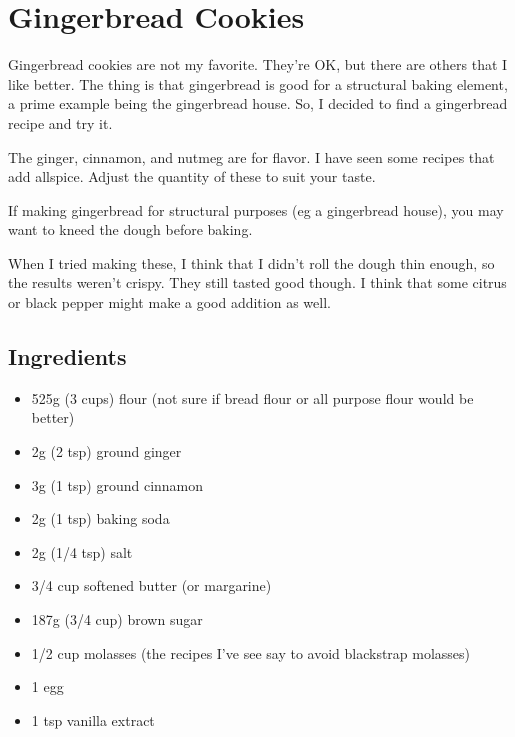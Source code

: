 \documentclass[10pt, openany]{book}
\begin{document}
\section{Gingerbread Cookies}
Gingerbread cookies are not my favorite.  They're OK, but there are others that I like better.  The thing is that gingerbread is good for a structural baking element, a prime example being the gingerbread house.  So, I decided to find a gingerbread recipe and try it.

The ginger, cinnamon, and nutmeg are for flavor.  I have seen some recipes that add allspice.  Adjust the quantity of these to suit your taste.

If making gingerbread for structural purposes (eg a gingerbread house), you may want to kneed the dough before baking.

When I tried making these, I think that I didn't roll the dough thin enough, so the results weren't crispy.  They still tasted good though.  I think that some citrus or black pepper might make a good addition as well.

\subsection{Ingredients}
\begin{itemize}
  \item 525g (3 cups) flour (not sure if bread flour or all purpose flour would be better)
  \item 2g (2 tsp) ground ginger
  \item 3g (1 tsp) ground cinnamon
  \item 2g (1 tsp) baking soda
  \item 2g (1/4 tsp) salt
  \item 3/4 cup softened butter (or margarine)
  \item 187g (3/4 cup) brown sugar
  \item 1/2 cup molasses (the recipes I've see say to avoid blackstrap molasses)
  \item 1 egg
  \item 1 tsp vanilla extract
\end{itemize}
\end{document}
